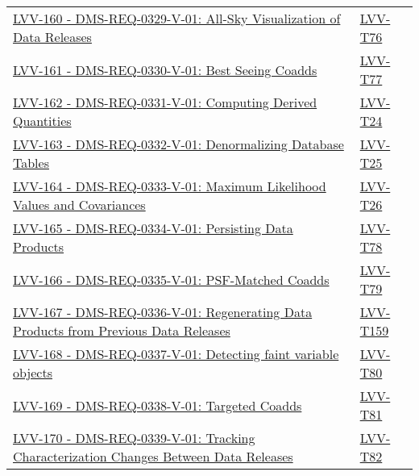 \begin{longtable}[]{p{13cm}p{3cm}}
\href{https://jira.lsstcorp.org/browse/LVV-160}{LVV-160 -
DMS-REQ-0329-V-01: All-Sky Visualization of Data Releases} &
\protect\hyperlink{lvv-t76---verify-implementation-of-all-sky-visualization-of-data-releases-dms-req-0329}{LVV-T76}\tabularnewline
\href{https://jira.lsstcorp.org/browse/LVV-161}{LVV-161 -
DMS-REQ-0330-V-01: Best Seeing Coadds} &
\protect\hyperlink{lvv-t77---verify-implementation-of-best-seeing-coadds-dms-req-0330}{LVV-T77}\tabularnewline
\href{https://jira.lsstcorp.org/browse/LVV-162}{LVV-162 -
DMS-REQ-0331-V-01: Computing Derived Quantities} &
\protect\hyperlink{lvv-t24---verify-implementation-of-computing-derived-quantities-dms-req-0331}{LVV-T24}\tabularnewline
\href{https://jira.lsstcorp.org/browse/LVV-163}{LVV-163 -
DMS-REQ-0332-V-01: Denormalizing Database Tables} &
\protect\hyperlink{lvv-t25---verify-implementation-of-denormalizing-database-tables-dms-req-0332}{LVV-T25}\tabularnewline
\href{https://jira.lsstcorp.org/browse/LVV-164}{LVV-164 -
DMS-REQ-0333-V-01: Maximum Likelihood Values and Covariances} &
\protect\hyperlink{lvv-t26---verify-implementation-of-maximum-likelihood-values-and-covariances-dms-req-0333}{LVV-T26}\tabularnewline
\href{https://jira.lsstcorp.org/browse/LVV-165}{LVV-165 -
DMS-REQ-0334-V-01: Persisting Data Products} &
\protect\hyperlink{lvv-t78---verify-implementation-of-persisting-data-products-dms-req-0334}{LVV-T78}\tabularnewline
\href{https://jira.lsstcorp.org/browse/LVV-166}{LVV-166 -
DMS-REQ-0335-V-01: PSF-Matched Coadds} &
\protect\hyperlink{lvv-t79---verify-implementation-of-psf-matched-coadds-dms-req-0335}{LVV-T79}\tabularnewline
\href{https://jira.lsstcorp.org/browse/LVV-167}{LVV-167 -
DMS-REQ-0336-V-01: Regenerating Data Products from Previous Data
Releases} &
\protect\hyperlink{lvv-t159---verify-implementation-of-regenerating-data-products-from-previous-data-releases-dms-req-0336}{LVV-T159}\tabularnewline
\href{https://jira.lsstcorp.org/browse/LVV-168}{LVV-168 -
DMS-REQ-0337-V-01: Detecting faint variable objects} &
\protect\hyperlink{lvv-t80---verify-implementation-of-detecting-faint-variable-objects-dms-req-0337}{LVV-T80}\tabularnewline
\href{https://jira.lsstcorp.org/browse/LVV-169}{LVV-169 -
DMS-REQ-0338-V-01: Targeted Coadds} &
\protect\hyperlink{lvv-t81---verify-implementation-of-targeted-coadds-dms-req-0338}{LVV-T81}\tabularnewline
\href{https://jira.lsstcorp.org/browse/LVV-170}{LVV-170 -
DMS-REQ-0339-V-01: Tracking Characterization Changes Between Data
Releases} &
\protect\hyperlink{lvv-t82---verify-implementation-of-tracking-characterization-changes-between-data-releases-dms-req-0339}{LVV-T82}\tabularnewline

\end{longtable}
